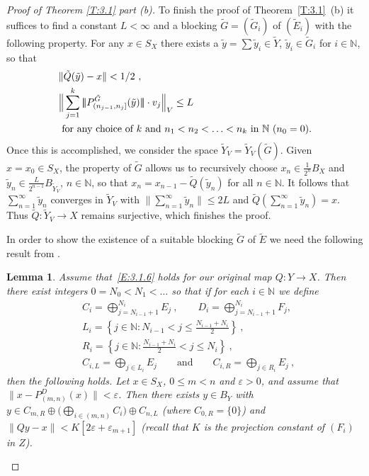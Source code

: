 \documentclass[11pt,leqno]{amsart}
\newtheorem{lem}[thm]{Lemma}
\theoremstyle{definition}
\newcommand{\N}{\mathbb{N}}
\def\trivert#1{|\!|\!| #1|\!|\!|}
\newcommand{\vp}{\varepsilon}
\newcommand{\norm}[1]{\lVert#1\rVert}
\newcommand{\Et}{\tilde E}
\newcommand{\yt}{\tilde y}
\newcommand{\Qt}{\tilde Q}
\newcommand{\Gt}{\tilde G}
\newcommand{\Yt}{\tilde Y}
\begin{document}
\begin{proof}[Proof of Theorem \ref{T:3.1} part (b)]
  To finish the proof of Theorem~\ref{T:3.1}~(b) it suffices to find a
  constant $L<\infty$ and a blocking $\Gt=(\Gt_i)$ of $(\Et_i)$ with
  the following property. For any $x\in S_X$ there exists a
  $\yt=\sum \yt_i\in \Yt$, $\yt_i\in \Gt_i$ for $i\in\N$, so that
  \begin{align}\label{E:3.7}
    &\|\Qt(\yt)-x\|<1/2\ ,\\
    &\label{E:3.8}\Big\|\sum_{j=1}^k\trivert{P^{\Gt}_{(n_{j-1},n_j]}(\yt)}
    \cdot v_j\Big\|_V\leq L\\
    &\ \text{for any choice of }k\ \text{and}\
    n_1<n_2<\ldots<n_k\text{ in }\N\ (n_0=0).\notag
  \end{align}
  Once this is accomplished, we consider the space
  $\Yt_V=\Yt_V(\Gt)$. Given $x=x_0\in S_X$, the property of $\Gt$
  allows us to recursively choose $x_n\in\frac1{2^n}B_X$ and $\yt_n\in
  \frac{L}{2^{n-1}}B_{\Yt_V}$, $n\in\N$, so that
  $x_n=x_{n-1}-\Qt(\yt_n)$ for all $n\in\N$. It follows that
  $\sum_{n=1}^\infty \yt_n $ converges in $\Yt_V$ with
  $\|\sum_{n=1}^\infty \yt_n\|\le 2L$ and $\Qt(\sum_{n=1}^\infty
  \yt_n)=x$. Thus $\Qt: \Yt_V\to X$  remains surjective, which
  finishes the proof.

  In order to show the existence of a suitable blocking $\Gt$ of $\Et$
  we need the following result from \cite{OS2}.
  
  \begin{lem}\label{L:3.8} \cite[Lemma  2.7]{OS2}
    Assume that~\eqref{E:3.1.6} holds for our original map $Q:Y\to
    X$. Then there exist integers $0= N_0 < N_1 <\dots$ so that if
    for each $i\in\N$ we define
    \begin{equation*}
      \begin{split}
	& C_i=\bigoplus_{j=N_{i-1}+1}^{N_i} E_j\ ,\qquad
	D_i=\bigoplus_{j=N_{i-1}+1}^{N_i} F_j,\\
	& L_i = \left\{ j\in \N : N_{i-1} < j\le  \frac{N_{i-1} +
	  N_i}2\right\}\ ,\\
	& R_i = \left\{ j\in \N : \frac{N_{i-1} +
	  N_i}2 <j\leq N_i \right\}\ ,\\
	& C_{i,L} = \bigoplus_{j\in L_i} E_j\qquad\text{and}\qquad
	C_{i,R} = \bigoplus_{j\in R_i} E_j \ ,
      \end{split}
    \end{equation*}
    then the following holds.
    Let $x\in S_X$, $0\leq m<n$ and $\vp>0$, and assume that
    $\norm{x-P^D_{(m,n)}(x)}<\vp$. Then there exists $y\in B_Y$ with
    $y\in C_{m,R}\oplus \Big(\bigoplus_{i\in (m,n)} C_i\Big)\oplus C_{n,L}$
    (where $C_{0,R}=\{0\}$) and $\norm{Qy - x}< K[2\vp +\vp_{m+1}]$
    (recall that $K$ is the projection constant of $(F_i)$ in $Z$).
  \end{lem}
  

\end{proof}
\end{document}
